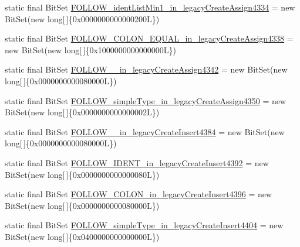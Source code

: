 \begin{DoxyCompactItemize}
static final Bit\-Set \hyperlink{classorg_1_1tzi_1_1use_1_1parser_1_1testsuite_1_1_test_suite_parser_a29a0f5714a55795a4d9fb8a03c167395}{F\-O\-L\-L\-O\-W\-\_\-ident\-List\-Min1\-\_\-in\-\_\-legacy\-Create\-Assign4334} = new Bit\-Set(new long\mbox{[}$\,$\mbox{]}\{0x0000000000000200\-L\})
\item 
static final Bit\-Set \hyperlink{classorg_1_1tzi_1_1use_1_1parser_1_1testsuite_1_1_test_suite_parser_a5b7981d5c97095c3c70daa5d7bc18eb9}{F\-O\-L\-L\-O\-W\-\_\-\-C\-O\-L\-O\-N\-\_\-\-E\-Q\-U\-A\-L\-\_\-in\-\_\-legacy\-Create\-Assign4338} = new Bit\-Set(new long\mbox{[}$\,$\mbox{]}\{0x1000000000000000\-L\})
\item 
static final Bit\-Set \hyperlink{classorg_1_1tzi_1_1use_1_1parser_1_1testsuite_1_1_test_suite_parser_a71f806ab99e560e3b85ee9ed0c74cfc5}{F\-O\-L\-L\-O\-W\-\_\-\_\-in\-\_\-legacy\-Create\-Assign4342} = new Bit\-Set(new long\mbox{[}$\,$\mbox{]}\{0x0000000000080000\-L\})
\item 
static final Bit\-Set \hyperlink{classorg_1_1tzi_1_1use_1_1parser_1_1testsuite_1_1_test_suite_parser_a18b238deeeb8961a0b1b12bc2de0cbd6}{F\-O\-L\-L\-O\-W\-\_\-simple\-Type\-\_\-in\-\_\-legacy\-Create\-Assign4350} = new Bit\-Set(new long\mbox{[}$\,$\mbox{]}\{0x0000000000000002\-L\})
\item 
static final Bit\-Set \hyperlink{classorg_1_1tzi_1_1use_1_1parser_1_1testsuite_1_1_test_suite_parser_abed03ab041465aa82eb2ec21f3e75432}{F\-O\-L\-L\-O\-W\-\_\-\_\-in\-\_\-legacy\-Create\-Insert4384} = new Bit\-Set(new long\mbox{[}$\,$\mbox{]}\{0x0000000000080000\-L\})
\item 
static final Bit\-Set \hyperlink{classorg_1_1tzi_1_1use_1_1parser_1_1testsuite_1_1_test_suite_parser_a80141d0776727524c385d75ea3359d73}{F\-O\-L\-L\-O\-W\-\_\-\-I\-D\-E\-N\-T\-\_\-in\-\_\-legacy\-Create\-Insert4392} = new Bit\-Set(new long\mbox{[}$\,$\mbox{]}\{0x0000000000000080\-L\})
\item 
static final Bit\-Set \hyperlink{classorg_1_1tzi_1_1use_1_1parser_1_1testsuite_1_1_test_suite_parser_a7b7c42668cf0cbb2ced97dc48aa8f3be}{F\-O\-L\-L\-O\-W\-\_\-\-C\-O\-L\-O\-N\-\_\-in\-\_\-legacy\-Create\-Insert4396} = new Bit\-Set(new long\mbox{[}$\,$\mbox{]}\{0x0000000000080000\-L\})
\item 
static final Bit\-Set \hyperlink{classorg_1_1tzi_1_1use_1_1parser_1_1testsuite_1_1_test_suite_parser_adf212fd6fed86484b720a8db9eaf27d2}{F\-O\-L\-L\-O\-W\-\_\-simple\-Type\-\_\-in\-\_\-legacy\-Create\-Insert4404} = new Bit\-Set(new long\mbox{[}$\,$\mbox{]}\{0x0400000000000000\-L\})

\end{DoxyCompactItemize}
